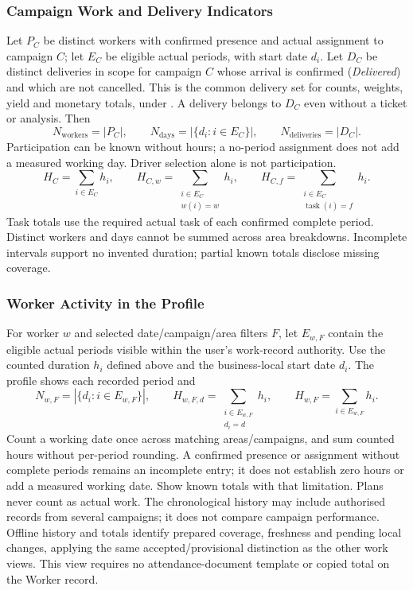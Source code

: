 \subsubsection{Campaign Work and Delivery Indicators}
Let \(P_C\) be distinct workers with confirmed presence and actual assignment
to campaign \(C\); let \(E_C\) be eligible actual periods, with start date \(d_i\).
Let \(D_C\) be distinct deliveries in scope for campaign \(C\) whose arrival is
confirmed (\textit{Delivered}) and which are not cancelled. This is the common
delivery set for counts, weights, yield and monetary totals, under
. A delivery belongs to \(D_C\) even without a ticket or analysis. Then
\[
N_{\mathrm{workers}}=|P_C|,\qquad
N_{\mathrm{days}}=|\{d_i:i\in E_C\}|,\qquad
N_{\mathrm{deliveries}}=|D_C|.
\]
Participation can be known without hours; a no-period assignment does not add
a measured working day. Driver selection alone is not participation.
\[
H_C=\sum_{i\in E_C}h_i,\qquad
H_{C,w}=\sum_{\substack{i\in E_C\\w(i)=w}}h_i,\qquad
H_{C,f}=\sum_{\substack{i\in E_C\\\operatorname{task}(i)=f}}h_i.
\]
Task totals use the required actual task of each confirmed complete period. Distinct workers
and days cannot be summed across area breakdowns. Incomplete intervals support
no invented duration; partial known totals disclose missing coverage.


\subsubsection{Worker Activity in the Profile}
\label{sec:worker-activity-calculations}
For worker \(w\) and selected date/campaign/area filters \(F\), let
\(E_{w,F}\) contain the eligible actual periods visible within the user's
work-record authority. Use the counted duration \(h_i\) defined above and the
business-local start date \(d_i\). The profile shows each recorded period and
\[
N_{w,F}=|\{d_i:i\in E_{w,F}\}|,\qquad
H_{w,F,d}=\sum_{\substack{i\in E_{w,F}\\d_i=d}}h_i,\qquad
H_{w,F}=\sum_{i\in E_{w,F}}h_i.
\]
Count a working date once across matching areas/campaigns, and sum counted hours
without per-period rounding. A confirmed presence or assignment without complete
periods remains an incomplete entry; it does not establish zero hours or add a
measured working date. Show known totals with that limitation. Plans never count
as actual work. The chronological history may include authorised records from
several campaigns; it does not compare campaign performance. Offline history and
totals identify prepared coverage, freshness and pending local changes, applying
the same accepted/provisional distinction as the other work views. This view
requires no attendance-document template or copied total on the Worker record.

